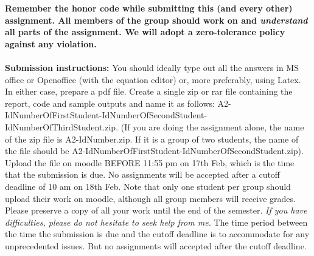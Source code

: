 \documentclass[11pt]{article}
\begin{document}
\maketitle

\textbf{Remember the honor code while submitting this (and every other) assignment. All members of the group should work on and \emph{understand} all parts of the assignment. We will adopt a \textbf{zero-tolerance policy} against any violation.}
\\
\\
\textbf{Submission instructions:} You should ideally type out all the answers in MS office or Openoffice (with the equation editor) or, more preferably, using Latex. In either case, prepare a pdf file. Create a single zip or rar file containing the report, code and sample outputs and name it as follows: A2-IdNumberOfFirstStudent-IdNumberOfSecondStudent-IdNumberOfThirdStudent.zip. (If you are doing the assignment alone, the name of the zip file is A2-IdNumber.zip. If it is a group of two students, the name of the file should be  A2-IdNumberOfFirstStudent-IdNumberOfSecondStudent.zip). Upload the file on moodle BEFORE 11:55 pm on 17th Feb, which is the time that the submission is due. No assignments will be accepted after a cutoff deadline of 10 am on 18th Feb. Note that only one student per group should upload their work on moodle, although all group members will receive grades. Please preserve a copy of all your work until the end of the semester. \emph{If you have difficulties, please do not hesitate to seek help from me.} The time period between the time the submission is due and the cutoff deadline is to accommodate for any unprecedented issues. But no assignments will accepted after the cutoff deadline. 
\end{document}

